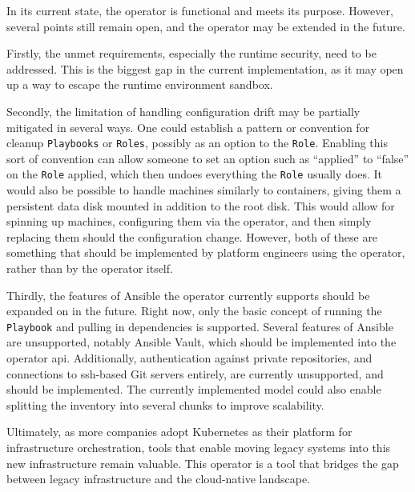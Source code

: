 In its current state, the operator is functional and meets its purpose.
However, several points still remain open, and the operator may be extended in the future.

Firstly, the unmet requirements, especially the runtime security, need to be addressed.
This is the biggest gap in the current implementation, as it may open up a way to escape the runtime environment sandbox.

Secondly, the limitation of handling configuration drift may be partially mitigated in several ways.
One could establish a pattern or convention for cleanup \texttt{Playbooks} or \texttt{Roles}, possibly as an option to the \texttt{Role}.
Enabling this sort of convention can allow someone to set an option such as \enquote{applied} to \enquote{false} on the \texttt{Role} applied, which then undoes everything the \texttt{Role} usually does.
It would also be possible to handle machines similarly to containers, giving them a persistent data disk mounted in addition to the root disk.
This would allow for spinning up machines, configuring them via the operator, and then simply replacing them should the configuration change.
However, both of these are something that should be implemented by platform engineers using the operator, rather than by the operator itself.

Thirdly, the features of Ansible the operator currently supports should be expanded on in the future.
Right now, only the basic concept of running the \texttt{Playbook} and pulling in dependencies is supported.
Several features of Ansible are unsupported, notably Ansible Vault, which should be implemented into the operator \gls{api}.
Additionally, authentication against private repositories, and connections to \gls{ssh}-based Git servers entirely, are currently unsupported, and should be implemented.
The currently implemented model could also enable splitting the inventory into several chunks to improve scalability.

\clearpage
Ultimately, as more companies adopt Kubernetes as their platform for infrastructure orchestration, tools that enable moving legacy systems into this new infrastructure remain valuable.
This operator is a tool that bridges the gap between legacy infrastructure and the cloud-native landscape.
